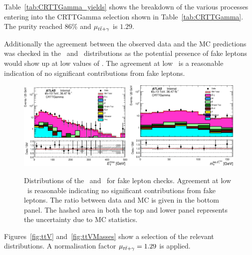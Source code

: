 		Table~\ref{tab:CRTTGamma_yields} shows the breakdown of the various processes entering into the CRTTGamma selection shown in Table~\ref{tab:CRTTGamma}. The purity reached $86\%$ and $\mu_{t\bar{t}+\gamma}$ is $1.29$. 



		Additionally the agreement between the observed data and the \ac{MC} predictions was checked in the \met\ and \mtlepmet\ distributions as the potential presence of fake leptons would show up at low values of \mtlepmet. The agreement at low \mtlepmet\ is a reasonable indication of no significant contributions from fake leptons.

		\begin{figure}[htbp]
			\begin{center}
				\includegraphics[width=0.49\textwidth]{figures/stop/ttGamma/Met_CRTTGamma_withRatio_log.eps}
				\includegraphics[width=0.49\textwidth]{figures/stop/ttGamma/MtMetLep_CRTTGamma_withRatio_log.eps}
				\caption{\label{fig:ttVFakeLepCheck} Distributions of the \met\ and \mtlepmet\ for fake lepton checks. Agreement at low \mtlepmet\ is reasonable indicating no significant contributions from fake leptons. The ratio between data and MC is given in the bottom panel. The hashed area in both the top and lower panel represents the uncertainty due to MC statistics.}
			\end{center}
		\end{figure}



		Figures~\ref{fig:ttV} and~\ref{fig:ttVMasses} show a selection of the relevant distributions. A normalisation factor $\mu_{t\bar{t}+\gamma} = 1.29$ is applied.

